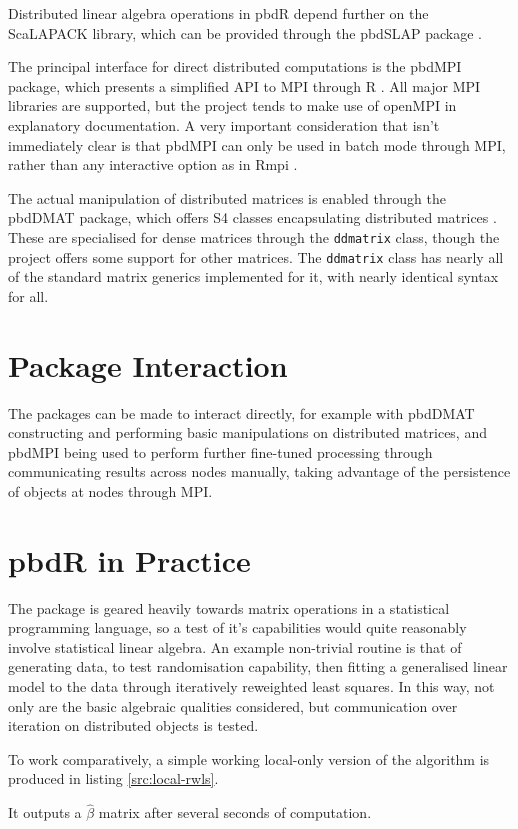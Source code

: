 \documentclass[a4paper]{article}
\begin{document}
Distributed linear algebra operations in pbdR depend further on the ScaLAPACK
library, which can be provided through the pbdSLAP package \cite{Chen2012pbdSLAPpackage}.

The principal interface for direct distributed computations is the pbdMPI
package, which presents a simplified API to MPI through R
\cite{Chen2012pbdMPIpackage}.  All major MPI libraries are supported, but the
project tends to make use of openMPI in explanatory documentation. A very
important consideration that isn't immediately clear  is that pbdMPI can only
be used in batch mode through MPI, rather than any interactive option as in
Rmpi \cite{yu02:_rmpi}.

The actual manipulation of distributed matrices is enabled through the pbdDMAT
package, which offers S4 classes encapsulating distributed matrices
\cite{pbdDMATpackage}. These are specialised for dense matrices through the
\texttt{ddmatrix} class, though the project offers some support for other
matrices. The \texttt{ddmatrix} class has nearly all of the standard matrix
generics implemented for it, with nearly identical syntax for all.

\section{Package Interaction}

The packages can be made to interact directly, for example with pbdDMAT
constructing and performing basic manipulations on distributed matrices, and
pbdMPI being used to perform further fine-tuned processing through
communicating results across nodes manually, taking advantage of the
persistence of objects at nodes through MPI.

\section{pbdR in Practice}

The package is geared heavily towards matrix operations in a statistical
programming language, so a test of it's capabilities would quite reasonably
involve statistical linear algebra. An example non-trivial routine is that of
generating data, to test randomisation capability, then fitting a generalised
linear model to the data through iteratively reweighted least squares. In this
way, not only are the basic algebraic qualities considered, but communication
over iteration on distributed objects is tested.

To work comparatively, a simple working local-only version of the algorithm is
produced in listing \ref{src:local-rwls}.

It outputs a \(\hat{\beta}\) matrix after several seconds of computation.
\end{document}
